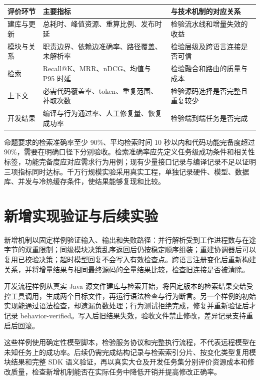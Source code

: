 \begin{center}\small
\begin{longtable}{P{0.19\textwidth}P{0.33\textwidth}P{0.38\textwidth}}
\toprule
评价环节 & 主要指标 & 与技术机制的对应关系 \\
\midrule\endhead
建库与更新 & 总耗时、峰值资源、重算比例、发布时延 & 检验流水线和增量失效的收益 \\
模块与关系 & 职责边界、依赖边准确率、路径覆盖、未解析率 & 检验层级及跨语言连接是否可信 \\
检索 & Recall@K、MRR、nDCG、均值与 P95 时延 & 检验融合和路由的质量与成本 \\
上下文 & 必需代码覆盖率、token、重复范围、补取次数 & 检验源码选择是否完整且重复较少 \\
开发结果 & 编译与行为通过率、人工修复量、恢复成功率 & 检验端到端任务是否完成 \\
\bottomrule
\end{longtable}\end{center}

命题要求的检索准确率至少 90\%、平均检索时间 10 秒以内和代码功能完备度超过 90\%，需要在明确口径下分别验收。检索准确率应先定义任务级成功条件和相关性标签，功能完备度应对应需求行为用例；现有少量接口记录与编译记录不足以证明三项指标同时达标。千万行规模实验采用真实工程，单独记录硬件、模型、数据库、并发与冷热缓存条件，使结果能够复现和比较。

\section{新增实现验证与后续实验}

新增机制以固定样例验证输入、输出和失败路径：并行解析受到工作进程数与在途字节的双重限制；同级模块决策乱序返回后仍按稳定顺序组装；重建协调器后可以复用已校验决策；超时模型回复不会写入有效检查点。跨语言注册变化后重新构建关系，并将增量结果与相同最终源码的全量结果比较，检查旧连接是否被清除。

开发流程样例从真实 Java 源文件建库与检索开始，将固定版本的检索结果交给受控工具调用，生成两个目标文件，再运行语法检查与行为断言。另一个样例的初始实现能通过语法检查，却遗漏负数处理；行为测试拒绝完成，修复并重新验证后才记录 behavior-verified。写入后旧结果失效，验收文件禁止修改，差异记录支持重启后回滚。

这些样例使用确定性模型脚本，检验服务协议和完整执行流程，不代表远程模型在未知任务上的成功率。后续仍需完成结构记录与检索索引分片、按变化类型复用模块结果和完整 SDK 语义验证，再以真实大仓及开发任务集分别评价资源成本和修改质量，检查新增机制能否在实际任务中降低开销并提高修改正确率。
